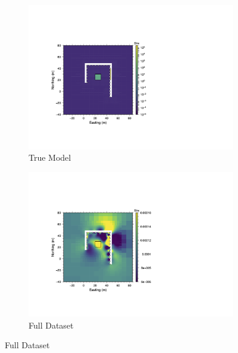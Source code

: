 \documentclass[final,authoryear,5p,times,twocolumn]{elsarticle}
\begin{document}
\begin{figure}[!ht]
   \centering

   \begin{subfigure}[b]{0.475\linewidth}
       \centering
       \includegraphics[trim=3.35cm 3.6cm 11.95cm 5.4cm, clip=true, width=\linewidth]{./Figures/Fig25a.png}
       \caption{True Model}
       \label{fig:Synth_Horseshoe_UniInfrastructure_RefMod}
   \end{subfigure}
   \hfill
   \begin{subfigure}[b]{0.475\linewidth}
       \centering
       \includegraphics[trim=3.35cm 3.6cm 11.95cm 5.4cm, clip=true, width=\linewidth]{./Figures/Fig25b.png}
       \caption{Full Dataset}
       \label{fig:Synth_Horseshoe_UniInfrastructure_InvMod_Full}
   \end{subfigure}


\end{figure}
\end{document}
